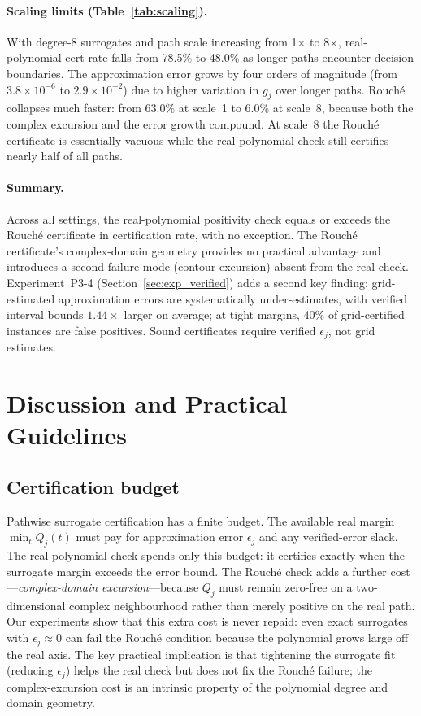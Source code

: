 \documentclass{article}
\theoremstyle{definition}
\begin{document}
\paragraph{Scaling limits (Table~\ref{tab:scaling}).}
With degree-8 surrogates and path scale increasing from 1$\times$ to
8$\times$, real-polynomial cert rate falls from 78.5\% to 48.0\% as longer
paths encounter decision boundaries.  The approximation error grows by four
orders of magnitude (from $3.8\times10^{-6}$ to $2.9\times10^{-2}$) due to
higher variation in $g_j$ over longer paths.  Rouch\'e collapses much faster:
from 63.0\% at scale~1 to 6.0\% at scale~8, because both the complex
excursion and the error growth compound.  At scale~8 the Rouch\'e certificate
is essentially vacuous while the real-polynomial check still certifies
nearly half of all paths.

\paragraph{Summary.}
Across all settings, the real-polynomial positivity check equals or exceeds
the Rouch\'e certificate in certification rate, with no exception.  The
Rouché certificate's complex-domain geometry provides no practical advantage
and introduces a second failure mode (contour excursion) absent from the
real check.  Experiment~P3-4 (Section~\ref{sec:exp_verified}) adds a second
key finding: grid-estimated approximation errors are systematically
under-estimates, with verified interval bounds $1.44\times$ larger on
average; at tight margins, 40\% of grid-certified instances are false
positives.  Sound certificates require verified $\epsilon_j$, not grid
estimates.

\section{Discussion and Practical Guidelines}
\label{sec:discussion}

\subsection{Certification budget}

Pathwise surrogate certification has a finite budget.  The available real
margin $\min_t Q_j(t)$ must pay for approximation error $\epsilon_j$ and any
verified-error slack.  The real-polynomial check spends only this budget: it
certifies exactly when the surrogate margin exceeds the error bound.  The
Rouch\'e check adds a further cost---\emph{complex-domain excursion}---because
$Q_j$ must remain zero-free on a two-dimensional complex neighbourhood rather
than merely positive on the real path.  Our experiments show that this extra
cost is never repaid: even exact surrogates with $\epsilon_j \approx 0$ can
fail the Rouch\'e condition because the polynomial grows large off the real
axis.  The key practical implication is that tightening the surrogate fit
(reducing $\epsilon_j$) helps the real check but does not fix the Rouch\'e
failure; the complex-excursion cost is an intrinsic property of the polynomial
degree and domain geometry.
\end{document}
